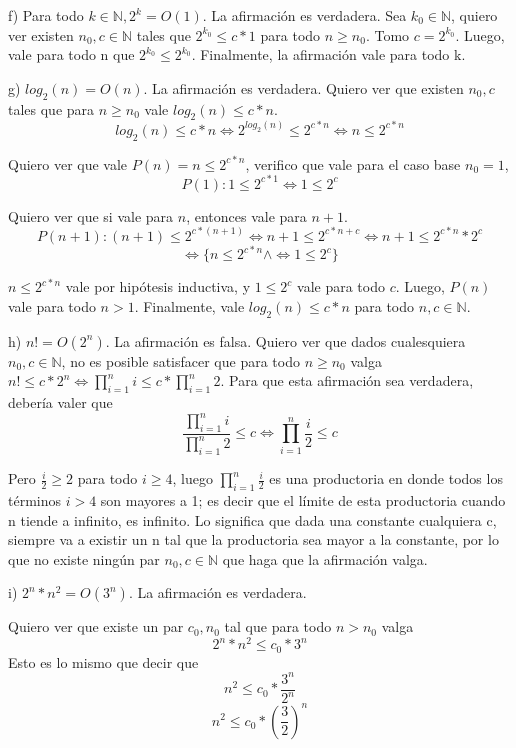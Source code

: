 \documentclass[11pt, spanish]{article}
\begin{document}
\vspace{1em}
f) Para todo $k \in \mathbb{N}, 2^k = O(1)$. La afirmación es verdadera. Sea $k_0 \in \mathbb{N}$, quiero ver existen $n_0, c \in \mathbb{N}$ tales que $2^{k_0} \leq c*1$ para todo $n\geq n_0$. Tomo $c=2^{k_0}$. Luego, vale para todo n que $2^{k_0} \leq 2^{k_0}$. Finalmente, la afirmación vale para todo k.

\vspace{1em}
g) $log_2(n) = O(n)$. La afirmación es verdadera. Quiero ver que existen $n_0, c$ tales que para $n\geq n_0$ vale $log_2(n) \leq c*n$.
\[
log_2(n) \leq c*n \iff 2^{log_2(n)} \leq 2^{c*n} \iff n \leq 2^{c*n}
\]

Quiero ver que vale $P(n) = n\leq 2^{c*n}$, verifico que vale para el caso base $n_0=1$,
\[
P(1): 1\leq 2^{c*1} \iff 1\leq 2^c
\]

Quiero ver que si vale para $n$, entonces vale para $n+1$.
\[
P(n+1): (n+1) \leq 2^{c*(n+1)}
\iff n+1 \leq 2^{c*n+c}
\iff n+1 \leq 2^{c*n} * 2^{c}
\]
\[
\iff \{
n \leq 2^{c*n} 
\land
\iff 1 \leq 2^{c}
\}
\]

$n \leq 2^{c*n}$ vale por hipótesis inductiva, y $1 \leq 2^{c}$ vale para todo $c$. Luego, $P(n)$ vale para todo $n>1$. Finalmente, vale $log_2(n) \leq c*n$ para todo $n,c \in \mathbb{N}$.

\vspace{1em}
h) $n! = O(2^n)$. La afirmación es falsa. Quiero ver que dados cualesquiera $n_0, c \in \mathbb{N}$, no es posible satisfacer que para todo $n\geq n_0$ valga $n! \leq c*2^n \iff \prod_{i=1}^{n}i \leq c*\prod_{i=1}^{n}2$. Para que esta afirmación sea verdadera, debería valer que \[
\frac{\prod_{i=1}^{n}i}{\prod_{i=1}^{n}2} \leq c
\iff
\prod_{i=1}^{n}{\frac{i}{2}} \leq c
\]

Pero $\frac{i}{2} \geq 2$ para todo $i\geq4$, luego $\prod_{i=1}^{n}{\frac{i}{2}}$ es una productoria en donde todos los términos $i>4$ son mayores a 1; es decir que el límite de esta productoria cuando n tiende a infinito, es infinito. Lo significa que dada una constante cualquiera c, siempre va a existir un n tal que la productoria sea mayor a la constante, por lo que no existe ningún par $n_0, c \in \mathbb{N}$ que haga que la afirmación valga.

\vspace{1em}
i) $2^n*n^2 = O(3^n)$. La afirmación es verdadera.

Quiero ver que existe un par $c_0, n_0$ tal que para todo $n>n_0$ valga
\[
2^n*n^2 \leq c_0*3^n
\]
Esto es lo mismo que decir que 
\[
n^2 \leq c_0*\frac{3^n}{2^n}
\]
\[
n^2 \leq c_0*(\frac{3}{2})^n
\]
\end{document}
